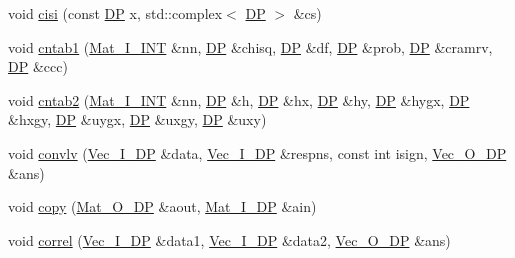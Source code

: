 \begin{DoxyCompactItemize}
\item 
void \mbox{\hyperlink{namespaceNR_abf0103a0b1c7451d1cad9852e6701274}{cisi}} (const \mbox{\hyperlink{namespaceNR_af6ff762dd605ff477b8e52387253a02a}{DP}} x, std\+::complex$<$ \mbox{\hyperlink{namespaceNR_af6ff762dd605ff477b8e52387253a02a}{DP}} $>$ \&cs)
\item 
void \mbox{\hyperlink{namespaceNR_ac0de242c7ce066888f5add441fe1099e}{cntab1}} (\mbox{\hyperlink{namespaceNR_a1e59f4068736f6f8a60d68e927e65a08}{Mat\+\_\+\+I\+\_\+\+I\+NT}} \&nn, \mbox{\hyperlink{namespaceNR_af6ff762dd605ff477b8e52387253a02a}{DP}} \&chisq, \mbox{\hyperlink{namespaceNR_af6ff762dd605ff477b8e52387253a02a}{DP}} \&df, \mbox{\hyperlink{namespaceNR_af6ff762dd605ff477b8e52387253a02a}{DP}} \&prob, \mbox{\hyperlink{namespaceNR_af6ff762dd605ff477b8e52387253a02a}{DP}} \&cramrv, \mbox{\hyperlink{namespaceNR_af6ff762dd605ff477b8e52387253a02a}{DP}} \&ccc)
\item 
void \mbox{\hyperlink{namespaceNR_a04d9c5104ecc26262c5c9cf755b6c496}{cntab2}} (\mbox{\hyperlink{namespaceNR_a1e59f4068736f6f8a60d68e927e65a08}{Mat\+\_\+\+I\+\_\+\+I\+NT}} \&nn, \mbox{\hyperlink{namespaceNR_af6ff762dd605ff477b8e52387253a02a}{DP}} \&h, \mbox{\hyperlink{namespaceNR_af6ff762dd605ff477b8e52387253a02a}{DP}} \&hx, \mbox{\hyperlink{namespaceNR_af6ff762dd605ff477b8e52387253a02a}{DP}} \&hy, \mbox{\hyperlink{namespaceNR_af6ff762dd605ff477b8e52387253a02a}{DP}} \&hygx, \mbox{\hyperlink{namespaceNR_af6ff762dd605ff477b8e52387253a02a}{DP}} \&hxgy, \mbox{\hyperlink{namespaceNR_af6ff762dd605ff477b8e52387253a02a}{DP}} \&uygx, \mbox{\hyperlink{namespaceNR_af6ff762dd605ff477b8e52387253a02a}{DP}} \&uxgy, \mbox{\hyperlink{namespaceNR_af6ff762dd605ff477b8e52387253a02a}{DP}} \&uxy)
\item 
void \mbox{\hyperlink{namespaceNR_a2082dd6448479336557410a290a17c2c}{convlv}} (\mbox{\hyperlink{namespaceNR_a9f943da53862537c552e2a770cb170ae}{Vec\+\_\+\+I\+\_\+\+DP}} \&data, \mbox{\hyperlink{namespaceNR_a9f943da53862537c552e2a770cb170ae}{Vec\+\_\+\+I\+\_\+\+DP}} \&respns, const int isign, \mbox{\hyperlink{namespaceNR_a970094d23441f8ef6a45282a7eb2103d}{Vec\+\_\+\+O\+\_\+\+DP}} \&ans)
\item 
void \mbox{\hyperlink{namespaceNR_a33f0ee887bd75c78a6b2f97a825f5be1}{copy}} (\mbox{\hyperlink{namespaceNR_adc1f8da33094b6bbeb1f5f899515ce54}{Mat\+\_\+\+O\+\_\+\+DP}} \&aout, \mbox{\hyperlink{namespaceNR_a2b8abfda8fffad6ba0a1b5a4c0773dbf}{Mat\+\_\+\+I\+\_\+\+DP}} \&ain)
\item 
void \mbox{\hyperlink{namespaceNR_a38e1298c084b073e4e7465dbd62ad7fb}{correl}} (\mbox{\hyperlink{namespaceNR_a9f943da53862537c552e2a770cb170ae}{Vec\+\_\+\+I\+\_\+\+DP}} \&data1, \mbox{\hyperlink{namespaceNR_a9f943da53862537c552e2a770cb170ae}{Vec\+\_\+\+I\+\_\+\+DP}} \&data2, \mbox{\hyperlink{namespaceNR_a970094d23441f8ef6a45282a7eb2103d}{Vec\+\_\+\+O\+\_\+\+DP}} \&ans)

\end{DoxyCompactItemize}
